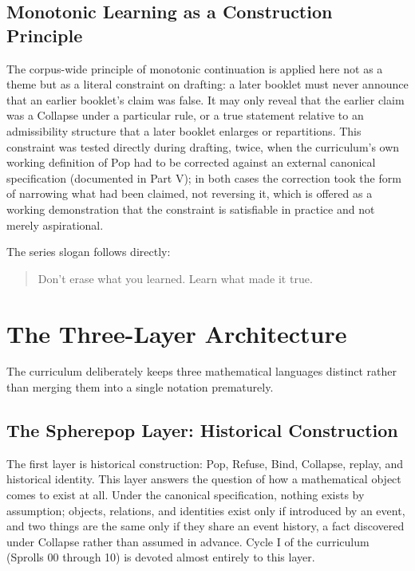 \documentclass[11pt,twoside]{book}
\begin{document}
\section{Monotonic Learning as a Construction Principle}

The corpus-wide principle of monotonic continuation is applied here not as a theme but as a literal constraint on drafting: a later booklet must never announce that an earlier booklet's claim was false. It may only reveal that the earlier claim was a Collapse under a particular rule, or a true statement relative to an admissibility structure that a later booklet enlarges or repartitions. This constraint was tested directly during drafting, twice, when the curriculum's own working definition of Pop had to be corrected against an external canonical specification (documented in Part V); in both cases the correction took the form of narrowing what had been claimed, not reversing it, which is offered as a working demonstration that the constraint is satisfiable in practice and not merely aspirational.

The series slogan follows directly:

\begin{quote}
Don't erase what you learned. Learn what made it true.
\end{quote}

\chapter{The Three-Layer Architecture}

The curriculum deliberately keeps three mathematical languages distinct rather than merging them into a single notation prematurely.

\section{The Spherepop Layer: Historical Construction}

The first layer is historical construction: Pop, Refuse, Bind, Collapse, replay, and historical identity. This layer answers the question of how a mathematical object comes to exist at all. Under the canonical specification, nothing exists by assumption; objects, relations, and identities exist only if introduced by an event, and two things are the same only if they share an event history, a fact discovered under Collapse rather than assumed in advance. Cycle I of the curriculum (Sprolls 00 through 10) is devoted almost entirely to this layer.
\end{document}
